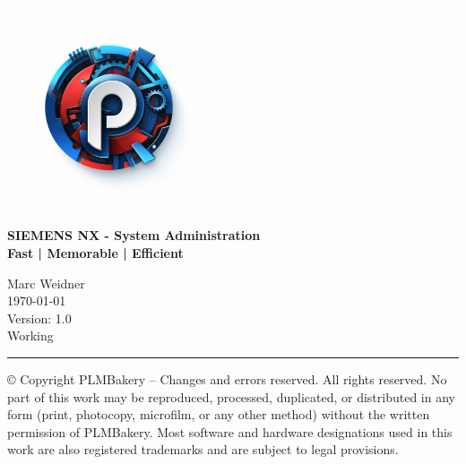 \documentclass{scrartcl}
\begin{document}

\begin{titlepage}
\begingroup
	\raggedleft
		\includegraphics[width=6cm]{pics/plogoblue}
		
\vspace{3cm}
	\textbf{{SIEMENS NX - System Administration}}\\
	\textbf{{\small Fast | Memorable | Efficient}}


\vspace{5cm}
	Marc Weidner\\
	{\today}\\	
	Version: 1.0\\
	Working\\
	\rule{0.2\linewidth}{1pt}%
	\par
\endgroup

\vspace{4cm}
{\tiny © Copyright PLMBakery – Changes and errors reserved. All rights reserved. No part of this work may be reproduced, processed, duplicated, or distributed in any form (print, photocopy, microfilm, or any other method) without the written permission of PLMBakery. Most software and hardware designations used in this work are also registered trademarks and are subject to legal provisions.}
\end{titlepage}

	
\tableofcontents
	\pagebreak


\listoffigures


\end{document}
